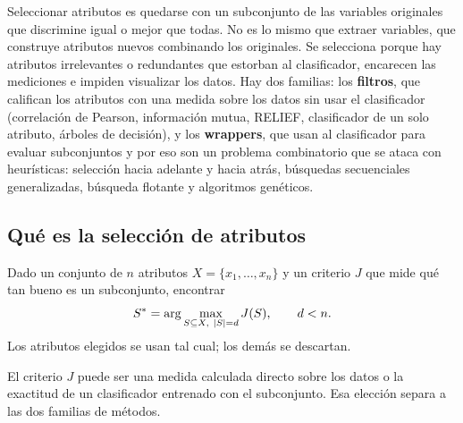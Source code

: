 \documentclass[11pt,letterpaper]{article}
\begin{document}

\begin{quick_sum}
    Seleccionar atributos es quedarse con un subconjunto de las
    variables originales que discrimine igual o mejor que todas. No es
    lo mismo que extraer variables, que construye atributos nuevos
    combinando los originales. Se selecciona porque hay atributos
    irrelevantes o redundantes que estorban al clasificador, encarecen
    las mediciones e impiden visualizar los datos. Hay dos familias: los
    \textbf{filtros}, que califican los atributos con una medida sobre
    los datos sin usar el clasificador (correlación de Pearson,
    información mutua, RELIEF, clasificador de un solo atributo,
    árboles de decisión), y los \textbf{wrappers}, que usan al
    clasificador para evaluar subconjuntos y por eso son un problema
    combinatorio que se ataca con heurísticas: selección hacia adelante
    y hacia atrás, búsquedas secuenciales generalizadas, búsqueda
    flotante y algoritmos genéticos.
\end{quick_sum}

\subsection*{Qué es la selección de atributos}

\begin{definicion}
    Dado un conjunto de $n$ atributos $X = \{x_1, \dots, x_n\}$ y un
    criterio $J$ que mide qué tan bueno es un subconjunto, encontrar
    \[
        S^* = \arg\max_{S \subseteq X,\ \left\lvert S \right\rvert = d} J(S) ,
        \qquad d < n .
    \]
    Los atributos elegidos se usan tal cual; los demás se descartan.
\end{definicion}

El criterio $J$ puede ser una medida calculada directo sobre los datos
o la exactitud de un clasificador entrenado con el subconjunto. Esa
elección separa a las dos familias de métodos.
\end{document}
